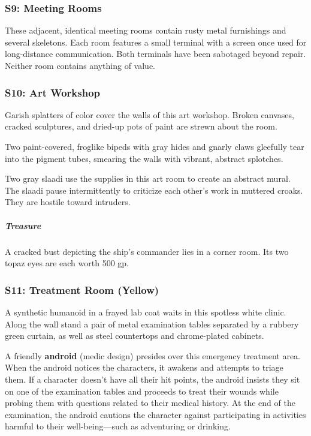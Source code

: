 \documentclass[10pt,a4paper,twoside,bg=print,twocolumn,openany,nodeprecatedcode]{dndbook}
\begin{document}
\subsubsection{S9: Meeting Rooms}
These adjacent, identical meeting rooms contain rusty metal furnishings and several skeletons. Each room features a small terminal with a screen once used for long-distance communication. Both terminals have been sabotaged beyond repair. Neither room contains anything of value.

\subsubsection{S10: Art Workshop}
\begin{DndReadAloud}{}
Garish splatters of color cover the walls of this art workshop. Broken canvases, cracked sculptures, and dried-up pots of paint are strewn about the room.

Two paint-covered, froglike bipeds with gray hides and gnarly claws gleefully tear into the pigment tubes, smearing the walls with vibrant, abstract splotches.

\end{DndReadAloud}

Two gray slaadi use the supplies in this art room to create an abstract mural. The slaadi pause intermittently to criticize each other's work in muttered croaks. They are hostile toward intruders.

\subparagraph{Treasure}
A cracked bust depicting the ship's commander lies in a corner room. Its two topaz eyes are each worth 500 gp.

\subsubsection{S11: Treatment Room (Yellow)}
\begin{DndReadAloud}{}
A synthetic humanoid in a frayed lab coat waits in this spotless white clinic. Along the wall stand a pair of metal examination tables separated by a rubbery green curtain, as well as steel countertops and chrome-plated cabinets.

\end{DndReadAloud}

A friendly \textbf{android} (medic design) presides over this emergency treatment area. When the android notices the characters, it awakens and attempts to triage them. If a character doesn't have all their hit points, the android insists they sit on one of the examination tables and proceeds to treat their wounds while probing them with questions related to their medical history. At the end of the examination, the android cautions the character against participating in activities harmful to their well-being—such as adventuring or drinking.
\end{document}
